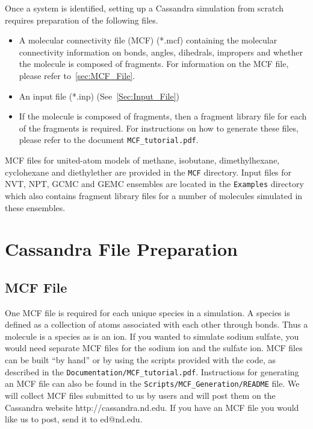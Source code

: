Once a system is identified, setting up a Cassandra simulation from
scratch requires preparation of the following files. \\

\begin{itemize}
\item A molecular connectivity file (MCF)  (*.mcf) containing the molecular
  connectivity information on bonds, angles, dihedrals, impropers and
  whether the molecule is composed of fragments. For information on
  the MCF file, please refer to~\autoref{sec:MCF_File}.

\item An input file (*.inp) (See~\autoref{Sec:Input_File})

\item If the molecule is composed of fragments, then a fragment library file for each of the fragments is required. For instructions on how to generate these files, please refer to the document \texttt{MCF\_tutorial.pdf}.

\end{itemize}
%
MCF files for united-atom models of methane, isobutane, dimethylhexane, cyclohexane and diethylether are provided in the \texttt{MCF} directory. Input files for NVT, NPT, GCMC and GEMC ensembles are located in the \texttt{Examples} directory which also contains fragment library files for a number of molecules simulated in these ensembles. 


\section{Cassandra File Preparation}

\subsection{MCF File}
One MCF file is required for each unique species in a simulation. A
species is defined as a collection of atoms associated with each other
through bonds. Thus a molecule is a species as is an ion. If you
wanted to simulate sodium sulfate, you would need separate MCF files
for the sodium ion and the sulfate ion. MCF files can be built ``by
hand'' or by using the scripts provided with the code, as described in
the \texttt{Documentation/MCF\_tutorial.pdf}. Instructions for generating an MCF file can also be found in the \texttt{Scripts/MCF\_Generation/README} file. We will collect MCF files submitted to us by users and will post them on the Cassandra
website http://cassandra.nd.edu. If you have an MCF file you would
like us to post, send it to ed@nd.edu.
%
%
